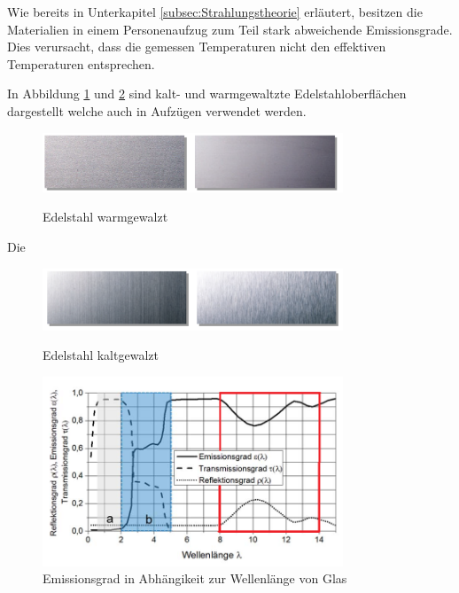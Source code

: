 Wie bereits in Unterkapitel \ref{subsec:Strahlungstheorie} erläutert, besitzen die Materialien in einem Personenaufzug zum Teil stark abweichende Emissionsgrade. Dies verursacht, dass die gemessen Temperaturen nicht den effektiven Temperaturen entsprechen. 

In Abbildung \ref{fig:Edelstahlgewalzt} und \ref{fig:Edelstahlmatt} sind kalt- und warmgewaltzte Edelstahloberflächen dargestellt welche auch in Aufzügen verwendet werden.   
\begin{figure}[H]
	\centering
	\includegraphics[width=0.8\textwidth]
	{fig/Edelstahl_gewalzt.PNG}
	\caption[Edelstahl warmgewalzt]{Edelstahl warmgewalzt} \protect\cite{Edelstahl}
	\label{fig:Edelstahlgewalzt}
\end{figure}

Die
\begin{figure}[H]
	\centering
	\includegraphics[width=0.8\textwidth]
	{fig/Edelstahl_matt.PNG}
	\caption[Edelstahl kaltgewalzt]{Edelstahl kaltgewalzt} \protect\cite{Edelstahl}
	\label{fig:Edelstahlmatt}	
\end{figure}




\begin{figure}[H]
	\centering
	\includegraphics[width=0.8\textwidth]
	{fig/Glas_bearbeitet.png}
	\caption[Emissionsgrad in Abhängikeit zur Wellenlnge]{Emissionsgrad in Abhängikeit zur Wellenlänge von Glas} 
	\label{fig:Glas}	
\end{figure}

